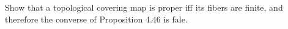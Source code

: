 Show that a topological covering map is proper iff its fibers are finite, and therefore the converse of Proposition 4.46 is fale.